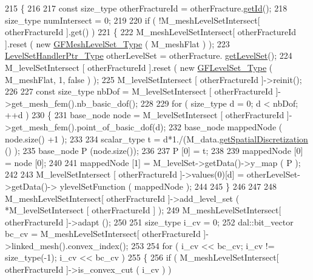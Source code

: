 \begin{DoxyCode}
215 \{
216     
217     \textcolor{keyword}{const} size\_type otherFractureId = otherFracture.\hyperlink{classFractureHandler_a7f7ec5b15315791f76d8deb0874511d6}{getId}();
218     size\_type numIntersect = 0;
219     
220     \textcolor{keywordflow}{if} ( !M\_meshLevelSetIntersect[ otherFractureId ].\textcolor{keyword}{get}() )
221     \{
222         M\_meshLevelSetIntersect[ otherFractureId ].reset ( \textcolor{keyword}{new} 
      \hyperlink{Core_8h_a126f7165f04db4ed0b72454469145a08}{GFMeshLevelSet\_Type} ( M\_meshFlat ) );
223         \hyperlink{LevelSetHandler_8h_aba343569cb3213c103252f69c39cad0b}{LevelSetHandlerPtr\_Type} otherLevelSet = otherFracture.
      \hyperlink{classFractureHandler_af37ab12a17f812a960da2aa71699ba0f}{getLevelSet}();
224         M\_levelSetIntersect [ otherFractureId ].reset ( \textcolor{keyword}{new} \hyperlink{Core_8h_a71358a15bd3925629e26ccbb214a0133}{GFLevelSet\_Type} ( M\_meshFlat, 1,
       \textcolor{keyword}{false} )  );
225         M\_levelSetIntersect [ otherFractureId ]->reinit();
226 
227         \textcolor{keyword}{const} size\_type nbDof = M\_levelSetIntersect [ otherFractureId ]->get\_mesh\_fem().nb\_basic\_dof();
228 
229         \textcolor{keywordflow}{for} ( size\_type d = 0; d < nbDof; ++d )
230         \{
231             base\_node node = M\_levelSetIntersect [ otherFractureId ]->get\_mesh\_fem().point\_of\_basic\_dof(d);
232             base\_node mappedNode ( node.size() +1 );
233 
234             scalar\_type t = d*1./(M\_data.\hyperlink{classFractureData_a5c10d579be7849be1a126c24982f8a23}{getSpatialDiscretization} () );
235             base\_node P (node.size());
236 
237             P [0] = t;
238 
239             mappedNode [0] = node [0];
240 
241             mappedNode [1] = M\_levelSet->getData()->y\_map ( P );
242 
243             M\_levelSetIntersect [ otherFractureId ]->values(0)[d] = otherLevelSet->getData()->
      ylevelSetFunction ( mappedNode );
244 
245         \}
246 
247 
248         M\_meshLevelSetIntersect[ otherFractureId ]->add\_level\_set ( *M\_levelSetIntersect [ otherFractureId 
      ] );
249         M\_meshLevelSetIntersect[ otherFractureId ]->adapt ();
250 
251         size\_type i\_cv = 0;
252         dal::bit\_vector bc\_cv = M\_meshLevelSetIntersect[ otherFractureId ]->linked\_mesh().convex\_index();
253         
254         \textcolor{keywordflow}{for} ( i\_cv << bc\_cv; i\_cv != size\_type(-1); i\_cv << bc\_cv )
255         \{
256             \textcolor{keywordflow}{if} ( M\_meshLevelSetIntersect[ otherFractureId ]->is\_convex\_cut ( i\_cv ) )

\end{DoxyCode}
